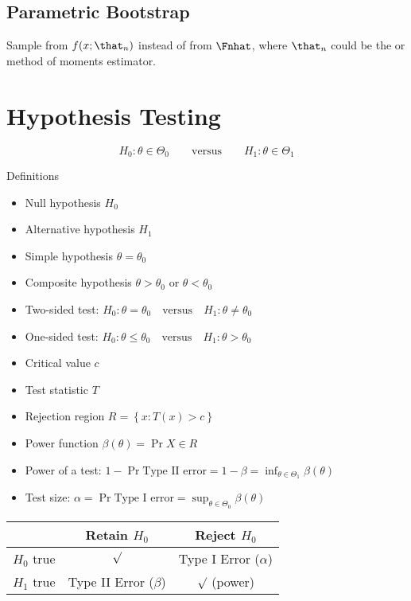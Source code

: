 \documentclass[landscape]{article}
\begin{document}
\begin{multicols*}{2}
\subsection{Parametric Bootstrap}

Sample from $f(x;\that_n)$ instead of from $\Fnhat$, where $\that_n$ could be
the \mle or method of moments estimator.

\section{Hypothesis Testing}

\[H_0:\theta\in\Theta_0 \qquad\text{versus}\qquad H_1:\theta\in\Theta_1\]

Definitions
\begin{itemize}
  \item Null hypothesis $H_0$
  \item Alternative hypothesis $H_1$
  \item Simple hypothesis $\theta = \theta_0$
  \item Composite hypothesis $\theta > \theta_0$ or $\theta < \theta_0$
  \item Two-sided test:
    $H_0:\theta=\theta_0 \quad\text{versus}\quad H_1:\theta\neq\theta_0$
  \item One-sided test:
    $H_0:\theta\le\theta_0 \quad\text{versus}\quad H_1:\theta>\theta_0$
  \item Critical value $c$
  \item Test statistic $T$
  \item Rejection region $R = \left\{ x: T(x) > c \right\}$
  \item Power function $\beta(\theta) = \Pr{X \in R}$
  \item Power of a test: $1 - \Pr{\text{Type II error}} = 1-\beta
    = \displaystyle\inf_{\theta \in \Theta_1} \beta(\theta)$
  \item Test size: $\alpha = \Pr{\text{Type I error}}
    = \displaystyle\sup_{\theta\in\Theta_0}\beta(\theta)$
\end{itemize}

\centering
\begin{tabular}{l|cc}
  & \textsf{Retain} $H_0$ & \textsf{Reject} $H_0$ \\
  \hline
  $H_0$ \textsf{true} & $\surd$ & Type I Error ($\alpha$)\\
  $H_1$ \textsf{true} & Type II Error ($\beta$) &
  $\surd$ (power) \\
\end{tabular}


\end{multicols*}
\end{document}
